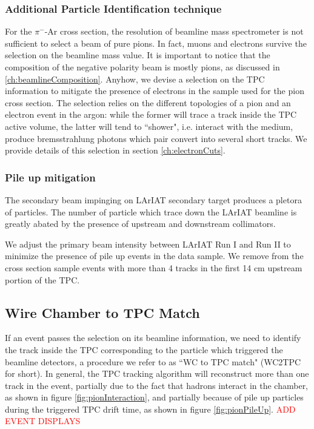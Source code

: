 \subsubsection{Additional Particle Identification technique}\label{ch:electrons}
For the $\pi^-$-Ar cross section, the resolution of  beamline mass spectrometer is not sufficient to select a beam of pure pions. In fact, muons and electrons survive the selection on the beamline mass value. It is important to notice that the composition of the negative polarity beam is mostly pions, as discussed in \ref{ch:beamlineComposition}.
Anyhow, we devise a selection on the TPC information to mitigate the presence of electrons in the sample used for the pion cross section. The selection relies on the different topologies of a pion and an electron event in the argon: while the former will trace a track inside the TPC active volume, the latter will tend to ``shower", i.e. interact with the medium, produce bremsstrahlung photons which pair convert into several short tracks. We provide details of this selection in section \ref{ch:electronCuts}.

\subsubsection{Pile up mitigation }\label{ch:pileUp}
The secondary beam impinging on LArIAT secondary target produces a pletora of particles. The number of particle which trace down the LArIAT beamline is greatly abated by the presence of upstream and downstream collimators. 

We adjust the primary beam intensity between LArIAT Run I and Run II to minimize the presence of pile up events in the data sample. We remove from the cross section sample events with more than 4 tracks in the first 14 cm upstream portion of the TPC.

\subsection{Wire Chamber to TPC Match}\label{ch:WC2TPCMatchMethod}
If an event passes the selection on its beamline information, we need to identify the track inside the TPC corresponding to the particle which triggered the beamline detectors, a procedure we refer to as ``WC to TPC match" (WC2TPC for short). In general, the TPC tracking algorithm will reconstruct more than one track in the event, partially due to the fact that hadrons interact in the chamber, as shown in figure \ref{fig:pionInteraction}, and partially because of pile up particles during the triggered TPC drift time, as shown in figure \ref{fig:pionPileUp}. 
\textcolor{red}{ADD EVENT DISPLAYS}

